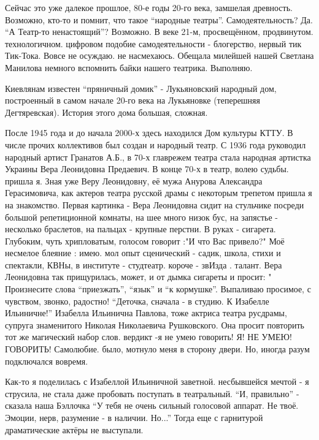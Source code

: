 Сейчас это уже далекое прошлое, 80-е годы 20-го века, замшелая древность.
Возможно, кто-то и помнит, что такое \enquote{народные театры}. Самодеятельность? Да.
\enquote{А Театр-то ненастоящий}? Возможно.  В веке 21-м, просвещённом, продвинутом.
технологичном. цифровом подобие самодеятельности - блогерство, нервый тик
Тик-Тока.  Вовсе не осуждаю. не насмехаюсь. Обещала милейшей нашей Светлана
Манилова немного вспомнить байки нашего театрика. Выполняю.

Киевлянам известен \enquote{пряничный домик} - Лукьяновский народный дом, построенный
в самом начале 20-го века на Лукьяновке (теперешняя Дегтяревская). История
этого дома большая, сложная. 

После 1945 года  и до начала 2000-х здесь находился Дом культуры КТТУ. В числе
прочих коллективов был создан и народный театр. С  1936 года руководил
народный артист Гранатов А.Б.,  в 70-х  главрежем театра  стала народная
артистка Украины Вера Леонидовна Предаевич.  В конце 70-х в театр, волею
судьбы. пришла я. Зная уже Веру Леонидовну, её мужа Анурова Александра
Герасимовича, как актеров театра русской драмы с некоторым трепетом пришла я на
знакомство. Первая картинка - Вера Леонидовна сидит на стульчике посреди
большой репетиционной комнаты, на шее много низок бус, на запястье - несколько
браслетов, на пальцах - крупные перстни. В руках - сигарета. Глубоким, чуть
хрипловатым, голосом говорит :"И что Вас привело?" Моё несмелое блеяние : имею.
мол опыт сценический - садик, школа, стихи и спектакли, КВНы, в институте -
студтеатр. короче - звИзда . талант. Вера Леонидовна так прищурилась, может, и
от дымка сигареты и просит: " Произнесите слова \enquote{приезжать}, \enquote{язык} и \enquote{к
кормушке}. Выпаливаю просимое, с чувством, звонко, радостно!  \enquote{Деточка, сначала
- в студию. К Изабелле Ильиничне!} Изабелла Ильинична Павлова, тоже актриса
театра русдрамы, супруга знаменитого Николая Николаевича Рушковского.  Она
просит повторить тот же магический набор слов. вердикт -я не умею говорить! Я!
НЕ УМЕЮ! ГОВОРИТЬ! Самолюбие. было, мотнуло меня в сторону двери. Но, иногда
разум подключался вовремя. 

Как-то я поделилась с Изабеллой Ильиничной заветной. несбывшейся мечтой - я
струсила, не стала даже пробовать поступать в театральный. \enquote{И, правильно} -
сказала наша Бэллочка  \enquote{У тебя не очень сильный голосовой аппарат. Не твоё.
Эмоции, нерв, разумение - в наличии. Но...}   Тогда еще с гарнитурой
драматические актёры не выступали.

